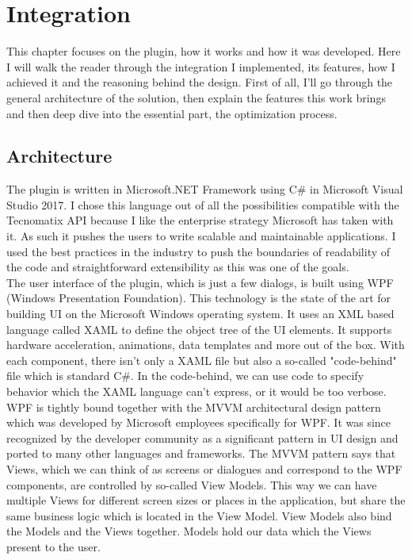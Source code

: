 \chapter{Integration}
\label{ch:integration}
\graphicspath{{chapters/Integration/}}

This chapter focuses on the plugin, how it works and how it was developed. 
Here I will walk the reader through the integration I implemented, its features, how I achieved it and the reasoning behind the design. 
First of all, I'll go through the general architecture of the solution, then explain the features this work brings and then deep dive into the essential part, the optimization process.

\section{Architecture}

The plugin is written in Microsoft.NET Framework using C\# in Microsoft Visual Studio 2017. I chose this language out of all the possibilities compatible with the Tecnomatix API because I like the enterprise strategy Microsoft has taken with it. As such it pushes the users to write scalable and maintainable applications. I used the best practices in the industry to push the boundaries of readability of the code and straightforward extensibility as this was one of the goals. \\
 
The user interface of the plugin, which is just a few dialogs, is built using WPF (Windows Presentation Foundation). 
This technology is the state of the art for building UI on the Microsoft Windows operating system. 
It uses an XML based language called XAML to define the object tree of the UI elements. 
It supports hardware acceleration, animations, data templates and more out of the box.
With each component, there isn't only a XAML file but also a so-called "code-behind" file which is standard C\#. In the code-behind, we can use code to specify behavior which the XAML language can't express, or it would be too verbose. \\

WPF is tightly bound together with the MVVM architectural design pattern which was developed by Microsoft employees specifically for WPF.
It was since recognized by the developer community as a significant pattern in UI design and ported to many other languages and frameworks.
The MVVM pattern says that Views, which we can think of as screens or dialogues and correspond to the WPF components, are controlled by so-called View Models. 
This way we can have multiple Views for different screen sizes or places in the application, but share the same business logic which is located in the View Model. 
View Models also bind the Models and the Views together. 
Models hold our data which the Views present to the user. \\

